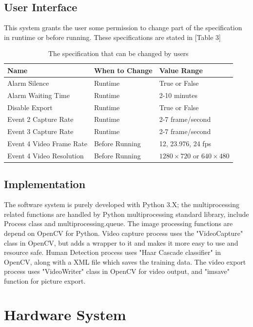 \documentclass{article}
\begin{document}
\subsection{User Interface}
\indent This system grants the user some permission to change part of the specification in runtime or before running. These specifications are stated in [Table 3]
\begin{table}[h]
\begin{tabular}{ | l | l | l |}
    \hline
     Name & When to Change & Value Range \\ \hline
     Alarm Silence & Runtime & True or False \\ \hline
     Alarm Waiting Time & Runtime & 2-10 minutes \\ \hline
     Disable Export & Runtime & True or False \\ \hline
     Event 2 Capture Rate & Runtime & 2-7 frame/second \\ \hline
     Event 3 Capture Rate & Runtime & 2-7 frame/second \\ \hline
     Event 4 Video Frame Rate & Before Running & 12, 23.976, 24 fps \\ \hline
     Event 4 Video Resolution & Before Running & $1280\times720$ or $640\times480$ \\ \hline
     
\end{tabular}

    \caption{The specification that can be changed by users}
\end{table}

\subsection{Implementation}
\indent The software system is purely developed with Python 3.X; the multiprocessing related functions are handled by Python multiprocessing standard library, include Process class and multiprocessing.queue.\newline
\indent The image processing functions are depend on OpenCV for Python. Video capture process uses the "VideoCapture" class in OpenCV, but adds a wrapper to it and makes it more easy to use and resource safe. Human Detection process uses "Haar Cascade classifier" in OpenCV, along with a XML file which saves the training data. The video export process uses "VideoWriter" class in OpenCV for video output, and "imsave" function for picture export.

\section{Hardware System}
\end{document}
